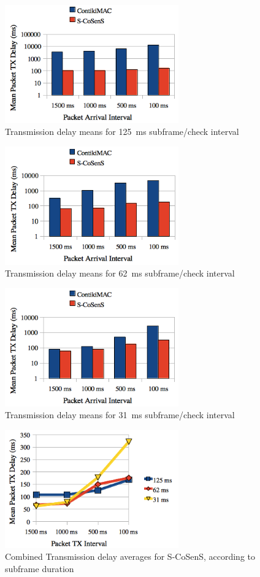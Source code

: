 \documentclass[conference]{IEEEtran}
\begin{document}
\begin{figure}[tbph]
  \centering
  \includegraphics[width=7.5cm]{graphes/Delays8Hz.png}
  \caption{Transmission delay means for 125~ms subframe/check interval}
  \label{FigDelays8Hz}
\end{figure}
\begin{figure}[tbph]
  \centering
  \includegraphics[width=7.5cm]{graphes/Delays16Hz.png}
  \caption{Transmission delay means for 62~ms subframe/check interval}
  \label{FigDelays16Hz}
\end{figure}
\begin{figure}[tbph]
  \centering
  \includegraphics[width=7.5cm]{graphes/Delays32Hz.png}
  \caption{Transmission delay means for 31~ms subframe/check interval}
  \label{FigDelays32Hz}
\end{figure}
\begin{figure}[tbph]
  \centering
  \includegraphics[width=7.5cm]{graphes/DelaysStabilitySCoSenS.png}
  \caption{Combined Transmission delay averages for S-CoSenS,
           according to subframe duration}
  \label{FigDelaysSCoSenS}
\end{figure}
\end{document}

